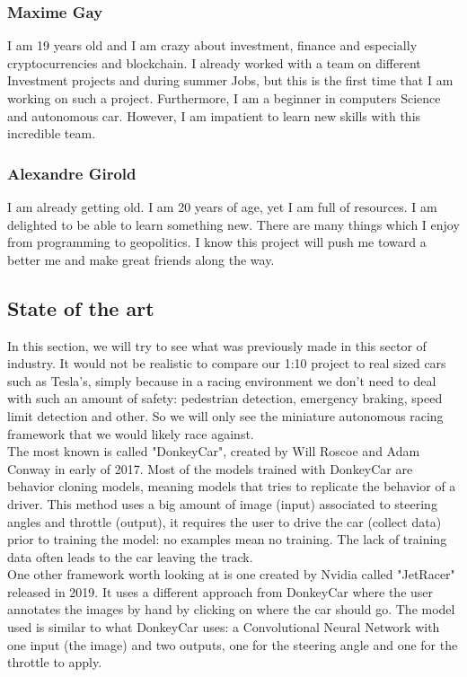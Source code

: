 \documentclass[12pt]{article}
\begin{document}
\subsubsection{Maxime Gay}
I am 19 years old and I am crazy about investment, finance and especially cryptocurrencies and blockchain. I already worked with a team on different Investment projects and during summer Jobs, but this is the first time that I am working on such a  project. Furthermore, I am a beginner in computers Science and autonomous car. However, I am impatient to learn new skills with this incredible team. 

\subsubsection{Alexandre Girold}
I am already getting old. I am 20 years of age, yet I am full of resources. I am delighted to be able to learn something new. There are many things which I enjoy from programming to geopolitics. I know this project will push me toward a better me and make great friends along the way. 

\subsection{State of the art}
In this section, we will try to see what was previously made in this sector of industry.
It would not be realistic to compare our 1:10 project to real sized cars such as Tesla's, simply because in a racing environment
we don't need to deal with such an amount of safety: pedestrian detection, emergency braking, speed limit detection and other.
So we will only see the miniature autonomous racing framework that we would likely race against.\\

The most known is called "DonkeyCar", created by Will Roscoe and Adam Conway in early of 2017. Most of the models trained with DonkeyCar are behavior cloning models, meaning models that tries to replicate the behavior of a driver. This method uses a big amount of image (input) associated to steering angles and throttle (output), it requires the user to drive the car (collect data) prior to training the model: no examples mean no training. The lack of training data often leads to the car leaving the track.\\

One other framework worth looking at is one created by Nvidia called "JetRacer" released in 2019. It uses a different approach from DonkeyCar where the user annotates the images by hand by clicking on where the car should go. The model used is similar to what DonkeyCar uses: a Convolutional Neural Network with one input (the image) and two outputs, one for the steering angle and one for the throttle to apply. \\
\end{document}
